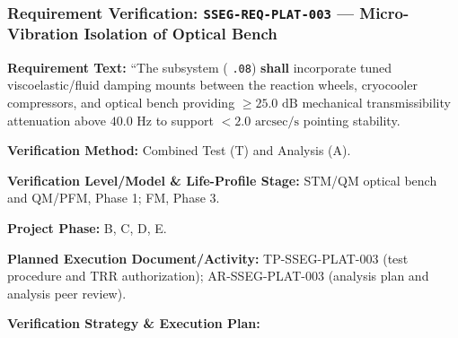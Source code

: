 \subsubsection{Requirement Verification: \texttt{SSEG-REQ-PLAT-003} --- Micro-Vibration Isolation of Optical Bench}
\label{ver:SSEG-REQ-PLAT-003}
\textbf{Requirement Text:} ``The  subsystem ( \texttt{.08}) \textbf{shall} incorporate tuned viscoelastic/fluid damping mounts between the reaction wheels, cryocooler compressors, and optical bench providing $\ge 25.0\text{ dB}$ mechanical transmissibility attenuation above $40.0\text{ Hz}$ to support $< 2.0\text{ arcsec/s}$  pointing stability.
\par\textbf{Verification Method:} Combined Test (T) and Analysis (A).
\par\textbf{Verification Level/Model \& Life-Profile Stage:} STM/QM optical bench and QM/PFM, Phase 1; FM, Phase 3.
\par\textbf{Project Phase:} B, C, D, E.
\par\textbf{Planned Execution Document/Activity:} TP-SSEG-PLAT-003 (test procedure and TRR authorization); AR-SSEG-PLAT-003 (analysis plan and analysis peer review).
\par\textbf{Verification Strategy \& Execution Plan:}
